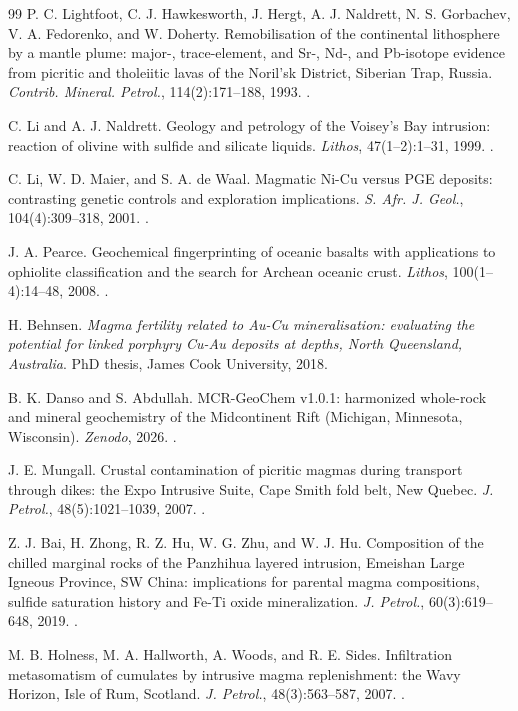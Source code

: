 \documentclass[10pt,twocolumn,letterpaper]{article}
\begin{document}
\begin{thebibliography}{99}
 P. C. Lightfoot, C. J. Hawkesworth, J. Hergt, A. J. Naldrett, N. S. Gorbachev, V. A. Fedorenko, and W. Doherty. Remobilisation of the continental lithosphere by a mantle plume: major-, trace-element, and Sr-, Nd-, and Pb-isotope evidence from picritic and tholeiitic lavas of the Noril'sk District, Siberian Trap, Russia. \textit{Contrib. Mineral. Petrol.}, 114(2):171--188, 1993. .

 C. Li and A. J. Naldrett. Geology and petrology of the Voisey's Bay intrusion: reaction of olivine with sulfide and silicate liquids. \textit{Lithos}, 47(1--2):1--31, 1999. .

 C. Li, W. D. Maier, and S. A. de Waal. Magmatic Ni-Cu versus PGE deposits: contrasting genetic controls and exploration implications. \textit{S. Afr. J. Geol.}, 104(4):309--318, 2001. .

 J. A. Pearce. Geochemical fingerprinting of oceanic basalts with applications to ophiolite classification and the search for Archean oceanic crust. \textit{Lithos}, 100(1--4):14--48, 2008. .

 H. Behnsen. \textit{Magma fertility related to Au-Cu mineralisation: evaluating the potential for linked porphyry Cu-Au deposits at depths, North Queensland, Australia}. PhD thesis, James Cook University, 2018.

 B. K. Danso and S. Abdullah. MCR-GeoChem v1.0.1: harmonized whole-rock and mineral geochemistry of the Midcontinent Rift (Michigan, Minnesota, Wisconsin). \textit{Zenodo}, 2026. .

 J. E. Mungall. Crustal contamination of picritic magmas during transport through dikes: the Expo Intrusive Suite, Cape Smith fold belt, New Quebec. \textit{J. Petrol.}, 48(5):1021--1039, 2007. .

 Z. J. Bai, H. Zhong, R. Z. Hu, W. G. Zhu, and W. J. Hu. Composition of the chilled marginal rocks of the Panzhihua layered intrusion, Emeishan Large Igneous Province, SW China: implications for parental magma compositions, sulfide saturation history and Fe-Ti oxide mineralization. \textit{J. Petrol.}, 60(3):619--648, 2019. .

 M. B. Holness, M. A. Hallworth, A. Woods, and R. E. Sides. Infiltration metasomatism of cumulates by intrusive magma replenishment: the Wavy Horizon, Isle of Rum, Scotland. \textit{J. Petrol.}, 48(3):563--587, 2007. .


\end{thebibliography}
\end{document}
